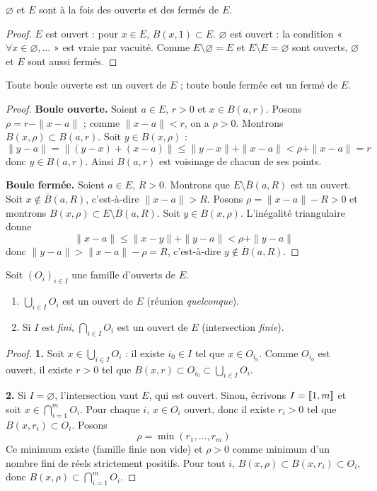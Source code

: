 \begin{prop}
\label{prop:vide-plein}
$\varnothing$ et $E$ sont à la fois des ouverts et des fermés de $E$.
\end{prop}

\begin{proof}
$E$ est ouvert : pour $x\in E$, $B(x,1)\subset E$. $\varnothing$ est ouvert : la condition « $\forall x\in\varnothing,\dots$ » est vraie par vacuité. Comme $E\setminus\varnothing=E$ et $E\setminus E=\varnothing$ sont ouverts, $\varnothing$ et $E$ sont aussi fermés.
\end{proof}

\begin{prop}
\label{prop:boules-ouvert-ferme}
Toute boule ouverte est un ouvert de $E$ ; toute boule fermée est un fermé de $E$.
\end{prop}

\begin{proof}
\textbf{Boule ouverte.} Soient $a\in E$, $r>0$ et $x\in B(a,r)$. Posons $\rho=r-\|x-a\|$ ; comme $\|x-a\|<r$, on a $\rho>0$. Montrons $B(x,\rho)\subset B(a,r)$. Soit $y\in B(x,\rho)$ :
\[\|y-a\| = \|(y-x)+(x-a)\| \leq \|y-x\|+\|x-a\| < \rho + \|x-a\| = r\]
donc $y\in B(a,r)$. Ainsi $B(a,r)$ est voisinage de chacun de ses points.

\textbf{Boule fermée.} Soient $a\in E$, $R>0$. Montrons que $E\setminus\overline{B}(a,R)$ est un ouvert. Soit $x\notin\overline{B}(a,R)$, c'est-à-dire $\|x-a\|>R$. Posons $\rho=\|x-a\|-R>0$ et montrons $B(x,\rho)\subset E\setminus\overline{B}(a,R)$. Soit $y\in B(x,\rho)$. L'inégalité triangulaire donne
\[\|x-a\| \leq \|x-y\|+\|y-a\| < \rho+\|y-a\|\]
donc $\|y-a\| > \|x-a\|-\rho = R$, c'est-à-dire $y\notin\overline{B}(a,R)$.
\end{proof}

\begin{prop}
\label{prop:union-ouverts}
Soit $(O_i)_{i\in I}$ une famille d'ouverts de $E$.
\begin{enumerate}
\item $\displaystyle\bigcup_{i\in I} O_i$ est un ouvert de $E$ (réunion \emph{quelconque}).
\item Si $I$ est \emph{fini}, $\displaystyle\bigcap_{i\in I} O_i$ est un ouvert de $E$ (intersection \emph{finie}).
\end{enumerate}
\end{prop}

\begin{proof}
\textbf{1.} Soit $x\in\bigcup_{i\in I}O_i$ : il existe $i_0\in I$ tel que $x\in O_{i_0}$. Comme $O_{i_0}$ est ouvert, il existe $r>0$ tel que $B(x,r)\subset O_{i_0}\subset\bigcup_{i\in I}O_i$.

\textbf{2.} Si $I=\varnothing$, l'intersection vaut $E$, qui est ouvert. Sinon, écrivons $I=\llbracket 1,m \rrbracket$ et soit $x\in\bigcap_{i=1}^{m}O_i$. Pour chaque $i$, $x\in O_i$ ouvert, donc il existe $r_i>0$ tel que $B(x,r_i)\subset O_i$. Posons
\[\rho = \min(r_1,\dots,r_m)\]
Ce minimum existe (famille finie non vide) et $\rho>0$ comme minimum d'un nombre fini de réels strictement positifs. Pour tout $i$, $B(x,\rho)\subset B(x,r_i)\subset O_i$, donc $B(x,\rho)\subset\bigcap_{i=1}^{m}O_i$.
\end{proof}


